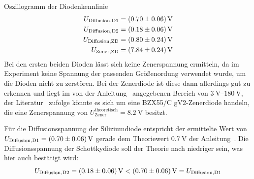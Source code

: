 \documentclass{article}
\theoremstyle{definition}
\begin{document}
\begin{aufgabe}{Oszillogramm der Diodenkennlinie}
    \begin{align*}
        U_\mathrm{Diffusion, D1} &= \SI{0.7 +- 0.06}{\volt} \\
        U_\mathrm{Diffusion, D2} &= \SI{0.18 +- 0.06}{\volt} \\
        U_\mathrm{Diffusion, ZD} &= \SI{0.8 +- 0.24}{\volt} \\
        U_\mathrm{Zener, ZD} &= \SI{7.84 +- 0.24}{\volt} \\
    \end{align*}
    Bei den ersten beiden Dioden lässt sich keine Zenerspannung ermitteln, da im Experiment keine Spannung der passenden Größenordung verwendet wurde, um die Dioden nicht zu zerstören. Bei der Zenerdiode ist diese dann allerdings gut zu erkennen und liegt im von der Anleitung~\cite{anleitung} angegebenen Bereich von $\SIrange{3}{180}{\volt}$, der Literatur~\cite{zenerspannungen} zufolge könnte es sich um eine BZX55/C  gV2-Zenerdiode handeln, die eine Zenerspannung von $U_\mathrm{Zener}^\mathrm{theoretisch} = \SI{8.2}{\volt}$ besitzt.

    Für die Diffusionsspannung der Siliziumdiode entspricht der ermittelte Wert von $U_\mathrm{Diffusion, D1} = \SI{0.7 +- 0.06}{\volt}$ gerade dem Theoriewert $\SI{0.7}{\volt}$ der Anleitung~\cite{anleitung}. Die Diffusionsspannung der Schottkydiode soll der Theorie nach niedriger sein, was hier auch bestätigt wird: 
    \begin{equation*}
        U_\mathrm{Diffusion, D2} = \SI{0.18 +- 0.06}{\volt} < \SI{0.7 +- 0.06}{\volt} = U_\mathrm{Diffusion, D1}
    \end{equation*}
    
\end{aufgabe}
\clearpage
\end{document}
